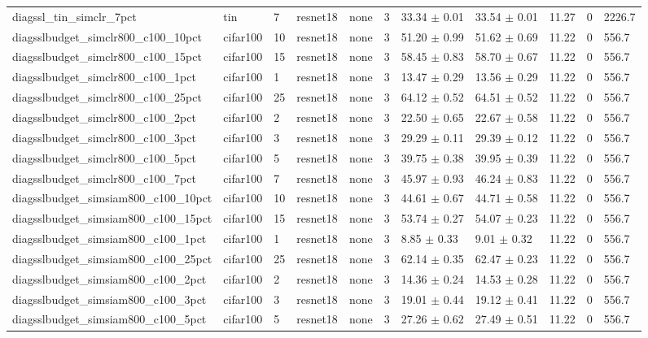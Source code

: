 \begin{tabular}{lllllllllll}
diagssl_tin_simclr_7pct & tin & 7 & resnet18 & none & 3 & 33.34 $\pm$ 0.01 & 33.54 $\pm$ 0.01 & 11.27 & 0 & 2226.7 \\
diagsslbudget_simclr800_c100_10pct & cifar100 & 10 & resnet18 & none & 3 & 51.20 $\pm$ 0.99 & 51.62 $\pm$ 0.69 & 11.22 & 0 & 556.7 \\
diagsslbudget_simclr800_c100_15pct & cifar100 & 15 & resnet18 & none & 3 & 58.45 $\pm$ 0.83 & 58.70 $\pm$ 0.67 & 11.22 & 0 & 556.7 \\
diagsslbudget_simclr800_c100_1pct & cifar100 & 1 & resnet18 & none & 3 & 13.47 $\pm$ 0.29 & 13.56 $\pm$ 0.29 & 11.22 & 0 & 556.7 \\
diagsslbudget_simclr800_c100_25pct & cifar100 & 25 & resnet18 & none & 3 & 64.12 $\pm$ 0.52 & 64.51 $\pm$ 0.52 & 11.22 & 0 & 556.7 \\
diagsslbudget_simclr800_c100_2pct & cifar100 & 2 & resnet18 & none & 3 & 22.50 $\pm$ 0.65 & 22.67 $\pm$ 0.58 & 11.22 & 0 & 556.7 \\
diagsslbudget_simclr800_c100_3pct & cifar100 & 3 & resnet18 & none & 3 & 29.29 $\pm$ 0.11 & 29.39 $\pm$ 0.12 & 11.22 & 0 & 556.7 \\
diagsslbudget_simclr800_c100_5pct & cifar100 & 5 & resnet18 & none & 3 & 39.75 $\pm$ 0.38 & 39.95 $\pm$ 0.39 & 11.22 & 0 & 556.7 \\
diagsslbudget_simclr800_c100_7pct & cifar100 & 7 & resnet18 & none & 3 & 45.97 $\pm$ 0.93 & 46.24 $\pm$ 0.83 & 11.22 & 0 & 556.7 \\
diagsslbudget_simsiam800_c100_10pct & cifar100 & 10 & resnet18 & none & 3 & 44.61 $\pm$ 0.67 & 44.71 $\pm$ 0.58 & 11.22 & 0 & 556.7 \\
diagsslbudget_simsiam800_c100_15pct & cifar100 & 15 & resnet18 & none & 3 & 53.74 $\pm$ 0.27 & 54.07 $\pm$ 0.23 & 11.22 & 0 & 556.7 \\
diagsslbudget_simsiam800_c100_1pct & cifar100 & 1 & resnet18 & none & 3 & 8.85 $\pm$ 0.33 & 9.01 $\pm$ 0.32 & 11.22 & 0 & 556.7 \\
diagsslbudget_simsiam800_c100_25pct & cifar100 & 25 & resnet18 & none & 3 & 62.14 $\pm$ 0.35 & 62.47 $\pm$ 0.23 & 11.22 & 0 & 556.7 \\
diagsslbudget_simsiam800_c100_2pct & cifar100 & 2 & resnet18 & none & 3 & 14.36 $\pm$ 0.24 & 14.53 $\pm$ 0.28 & 11.22 & 0 & 556.7 \\
diagsslbudget_simsiam800_c100_3pct & cifar100 & 3 & resnet18 & none & 3 & 19.01 $\pm$ 0.44 & 19.12 $\pm$ 0.41 & 11.22 & 0 & 556.7 \\
diagsslbudget_simsiam800_c100_5pct & cifar100 & 5 & resnet18 & none & 3 & 27.26 $\pm$ 0.62 & 27.49 $\pm$ 0.51 & 11.22 & 0 & 556.7 \\

\end{tabular}
